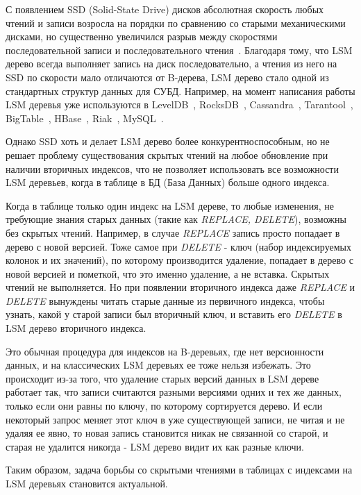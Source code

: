 \documentclass[a4paper,hidelinks,12pt]{article}
\begin{document}
С появлением SSD (Solid-State Drive) дисков абсолютная скорость любых чтений и
записи возросла на порядки по сравнению со старыми механическими дисками, но
существенно увеличился разрыв между скоростями последовательной записи и
последовательного чтения~\cite{ssd-tradeof}. Благодаря тому, что LSM дерево
всегда выполняет запись на диск последовательно, а чтения из него на SSD по
скорости мало отличаются от B-дерева, LSM дерево стало одной из стандартных
структур данных для СУБД. Например, на момент написания работы LSM деревья уже
используются в LevelDB~\cite{leveldb}, RocksDB~\cite{rocksdb},
Cassandra~\cite{open-chan-ssd}, Tarantool~\cite{tarantool},
BigTable~\cite{open-chan-ssd}, HBase~\cite{open-chan-ssd}, Riak~\cite{riak},
MySQL~\cite{myrocks}.

Однако SSD хоть и делает LSM дерево более конкурентноспособным, но не решает
проблему существования скрытых чтений на любое обновление при наличии вторичных
индексов, что не позволяет использовать все возможности LSM деревьев, когда
в таблице в БД (База Данных) больше одного индекса.

Когда в таблице только один индекс на LSM дереве, то любые изменения, не
требующие знания старых данных (такие как \textit{REPLACE, DELETE}), возможны
без скрытых чтений. Например, в случае \textit{REPLACE} запись просто попадает
в дерево с новой версией. Тоже самое при \textit{DELETE} - ключ (набор
индексируемых колонок и их значений), по которому производится удаление,
попадает в дерево с новой версией и пометкой, что это именно удаление, а не
вставка. Скрытых чтений не выполняется. Но при появлении вторичного индекса даже
\textit{REPLACE} и \textit{DELETE} вынуждены читать старые данные из первичного
индекса, чтобы узнать, какой у старой записи был вторичный ключ, и вставить его
\textit{DELETE} в LSM дерево вторичного индекса.

Это обычная процедура для индексов на B-деревьях, где нет версионности данных, и
на классических LSM деревьях ее тоже нельзя избежать. Это происходит из-за того,
что удаление старых версий данных в LSM дереве работает так, что записи
считаются разными версиями одних и тех же данных, только если они равны по
ключу, по которому сортируется дерево. И если некоторый запрос меняет этот ключ
в уже существующей записи, не читая и не удаляя ее явно, то новая запись
становится никак не связанной со старой, и старая не удалится никогда - LSM
дерево видит их как разные ключи.

Таким образом, задача борьбы со скрытыми чтениями в таблицах с индексами на LSM
деревьях становится актуальной.
\end{document}
